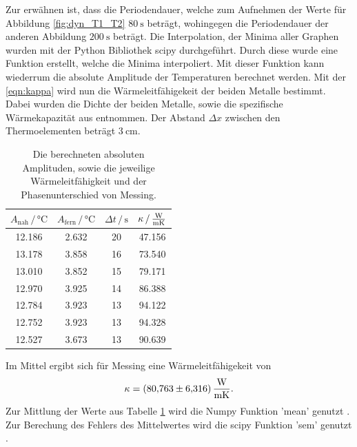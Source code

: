 
Zur erwähnen ist, dass die Periodendauer, welche zum Aufnehmen der Werte für Abbildung \ref{fig:dyn_T1_T2} $\SI{80}{\second}$ beträgt, wohingegen die Periodendauer der anderen Abbildung $\SI{200}{\second}$ beträgt.
Die Interpolation, der Minima aller Graphen wurden mit der Python Bibliothek scipy \cite{scipy} durchgeführt.
Durch diese wurde eine Funktion erstellt, welche die Minima interpoliert.
Mit dieser Funktion kann wiederrum die absolute Amplitude der Temperaturen berechnet werden.
Mit der \eqref{eqn:kappa} wird nun die Wärmeleitfähigekeit der beiden Metalle bestimmt.
Dabei wurden die Dichte der beiden Metalle, sowie die spezifische Wärmekapazität aus \cite{anleitung} entnommen.
Der Abstand $\Delta x$ zwischen den Thermoelementen beträgt $\SI{3}{\centi\meter}$.

\begin{table}
\centering
\caption{Die berechneten absoluten Amplituden, sowie die jeweilige Wärmeleitfähigkeit und der Phasenunterschied von Messing.}
\begin{tabular}{cccc}    
    \toprule
    $A_\text{nah} \,/\, \si{\celsius}$ & $A_\text{fern} \,/\, \si{\celsius}$ & $\Delta t \,/\, \si{\second}$ & $\kappa \, / \, \si{\frac{\watt}{\meter\kelvin}}$ \\
    \midrule
    12.186 & 2.632 & 20 & 47.156 \\
    13.178 & 3.858 & 16 & 73.540 \\
    13.010 & 3.852 & 15 & 79.171 \\
    12.970 & 3.925 & 14 & 86.388 \\
    12.784 & 3.923 & 13 & 94.122 \\
    12.752 & 3.923 & 13 & 94.328 \\
    12.527 & 3.673 & 13 & 90.639 \\
    \bottomrule
\end{tabular}
\label{tab:erg_mess}
\end{table}

Im Mittel ergibt sich für Messing eine Wärmeleitfähigekeit von 
\begin{equation*}
    \kappa = \SI{80.763(6316)}{\frac{\watt}{\meter\kelvin}} .
\end{equation*}
Zur Mittlung der Werte aus Tabelle \ref{tab:erg_mess} wird die Numpy Funktion 'mean' genutzt \cite{numpy}.
Zur Berechung des Fehlers des Mittelwertes wird die scipy Funktion 'sem' genutzt \cite{scipy}.

